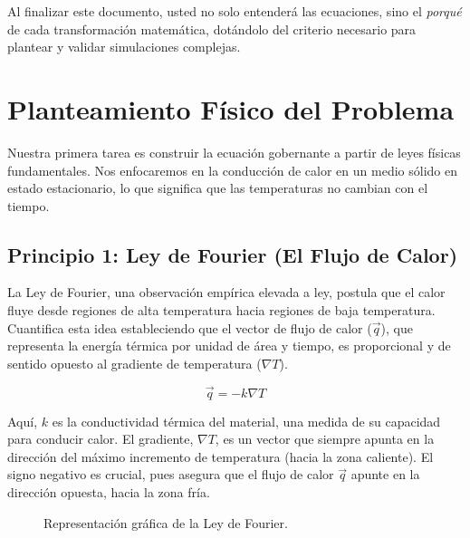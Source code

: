 \documentclass[11pt, a4paper]{article}
\begin{document}
Al finalizar este documento, usted no solo entenderá las ecuaciones, sino el \textit{porqué} de cada transformación matemática, dotándolo del criterio necesario para plantear y validar simulaciones complejas.

\section{Planteamiento Físico del Problema}
\label{sec:fisica}
Nuestra primera tarea es construir la ecuación gobernante a partir de leyes físicas fundamentales. Nos enfocaremos en la conducción de calor en un medio sólido en estado estacionario, lo que significa que las temperaturas no cambian con el tiempo.

\subsection{Principio 1: Ley de Fourier (El Flujo de Calor)}
La Ley de Fourier, una observación empírica elevada a ley, postula que el calor fluye desde regiones de alta temperatura hacia regiones de baja temperatura. Cuantifica esta idea estableciendo que el vector de flujo de calor ($\vec{q}$), que representa la energía térmica por unidad de área y tiempo, es proporcional y de sentido opuesto al gradiente de temperatura ($\nabla T$).

\begin{equation}
    \vec{q} = -k \nabla T
    \label{eq:fourier}
\end{equation}

Aquí, $k$ es la conductividad térmica del material, una medida de su capacidad para conducir calor. El gradiente, $\nabla T$, es un vector que siempre apunta en la dirección del máximo incremento de temperatura (hacia la zona caliente). El signo negativo es crucial, pues asegura que el flujo de calor $\vec{q}$ apunte en la dirección opuesta, hacia la zona fría.

\begin{figure}[h!]
\centering
{}
\caption{Representación gráfica de la Ley de Fourier.}
\label{fig:fourier}
\end{figure}
\end{document}
